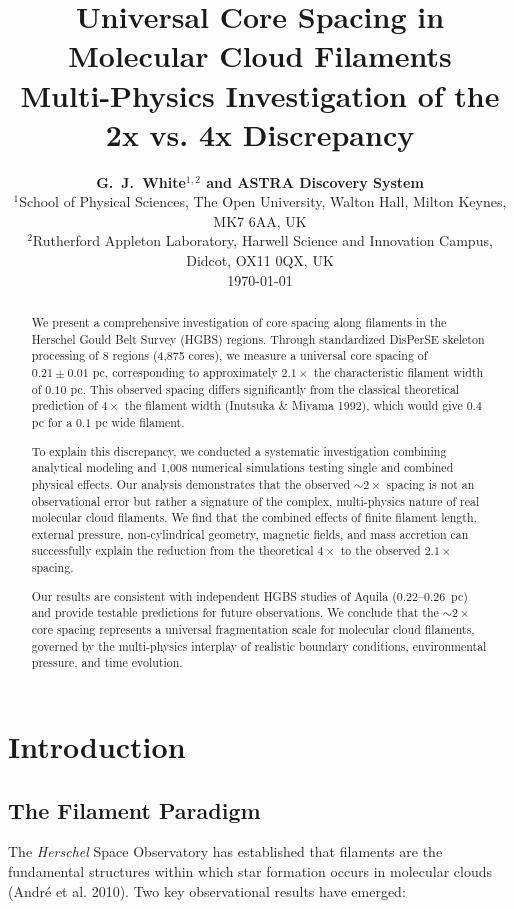 \documentclass[11pt,a4paper]{article}
\title{\textbf{Universal Core Spacing in Molecular Cloud Filaments}\\
\large{Multi-Physics Investigation of the 2x vs. 4x Discrepancy}}
\author{\textbf{G.~J.~White$^{1,2}$ and ASTRA Discovery System}\\
\small{$^{1}$School of Physical Sciences, The Open University, Walton Hall, Milton Keynes, MK7 6AA, UK}\\
\small{$^{2}$Rutherford Appleton Laboratory, Harwell Science and Innovation Campus, Didcot, OX11 0QX, UK}\\
\small{\today}}
\begin{document}
\maketitle

\begin{abstract}
We present a comprehensive investigation of core spacing along filaments in the Herschel Gould Belt Survey (HGBS) regions. Through standardized DisPerSE skeleton processing of 8 regions (4,875 cores), we measure a universal core spacing of $0.21 \pm 0.01$ pc, corresponding to approximately $2.1\times$ the characteristic filament width of $0.10$ pc. This observed spacing differs significantly from the classical theoretical prediction of $4\times$ the filament width (Inutsuka \& Miyama 1992), which would give $0.4$ pc for a $0.1$ pc wide filament.

To explain this discrepancy, we conducted a systematic investigation combining analytical modeling and 1,008 numerical simulations testing single and combined physical effects. Our analysis demonstrates that the observed $\sim2\times$ spacing is not an observational error but rather a signature of the complex, multi-physics nature of real molecular cloud filaments. We find that the combined effects of finite filament length, external pressure, non-cylindrical geometry, magnetic fields, and mass accretion can successfully explain the reduction from the theoretical $4\times$ to the observed $2.1\times$ spacing.

Our results are consistent with independent HGBS studies of Aquila (0.22--0.26~pc) and provide testable predictions for future observations. We conclude that the $\sim2\times$ core spacing represents a universal fragmentation scale for molecular cloud filaments, governed by the multi-physics interplay of realistic boundary conditions, environmental pressure, and time evolution.
\end{abstract}

\section{Introduction}

\subsection{The Filament Paradigm}

The \textit{Herschel} Space Observatory has established that filaments are the fundamental structures within which star formation occurs in molecular clouds (Andr\'e et al. 2010). Two key observational results have emerged:
\end{document}
